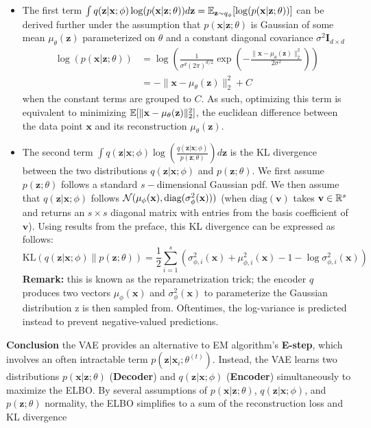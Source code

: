 \begin{itemize}
    \item The first term $\int q(\mathbf{z}|\mathbf{x};\phi) \log(p(\mathbf{x}|\mathbf{z};\theta)) d\mathbf{z}=\mathbb{E}_{\mathbf{z}\sim q_{\phi}}[\log(p(\mathbf{x}|\mathbf{z};\theta))]$ can be derived further under the assumption that $p(\mathbf{x}|\mathbf{z};\theta)$ is Gaussian of some mean $\mu_{\theta}(\mathbf{z})$ parameterized on $\theta$ and a constant diagonal covariance $\sigma^2 \mathbf{I}_{d\times d}$
    \begin{align*}
        \log(p(\mathbf{x}|\mathbf{z};\theta))
        &= \log\left( \frac{1}{\sigma^d (2\pi)^{d/2}} \exp\left( -\frac{\|\mathbf{x} - \mu_\theta(\mathbf{z})\|_2^2}{2\sigma^2} \right) \right) \\
        &= -\|\mathbf{x} - \mu_\theta(\mathbf{z})\|_2^2 + C
    \end{align*}
    when the constant terms are grouped to $C$. As such, optimizing this term is equivalent to minimizing $\mathbb{E}[\|\mathbf{x} - \mu_\theta(\mathbf{z})\|_2^2]$, the euclidean difference between the data point $\mathbf{x}$ and its reconstruction $\mu_\theta(\mathbf{z})$.
    \item The second term $\int q(\mathbf{z}|\mathbf{x};\phi) \log\left(\frac{q(\mathbf{z}|\mathbf{x};\phi)}{p(\mathbf{z};\theta)}\right) d\mathbf{z}$ is the KL divergence between the two distributions $q(\mathbf{z}|\mathbf{x};\phi)$ and $p(\mathbf{z};\theta)$. We first assume $p(\mathbf{z};\theta)$ follows a standard $s-$dimensional Gaussian pdf. We then assume that $q(\mathbf{z}|\mathbf{x};\phi)$ follows $\mathcal{N}(\mu_{\phi}(\mathbf{x}),\text{diag}(\sigma_{\phi}^2(\mathbf{x})))$ (when $\text{diag}(\mathbf{v})$ takes $\mathbf{v}\in\mathbb{R}^s$ and returns an $s\times s$ diagonal matrix with entries from the basis coefficient of $\mathbf{v}$). Using results from the preface, this KL divergence can be expressed as follows:
    \[
        \mathrm{KL}(q(\mathbf{z}|\mathbf{x};\phi) \| p(\mathbf{z};\theta)) = \frac{1}{2} \sum_{i=1}^s \left( \sigma_{\phi,i}^2(\mathbf{x}) + \mu_{\phi,i}^2(\mathbf{x}) - 1 - \log \sigma_{\phi,i}^2(\mathbf{x}) \right)
    \]
    \textbf{Remark:} this is known as the reparametrization trick; the encoder $q$ produces two vectors $\mu_{\phi}(\mathbf{x})$ and $\sigma_{\phi}^2(\mathbf{x})$ to parameterize the Gaussian distribution $\text{z}$ is then sampled from. Oftentimes, the log-variance is predicted instead to prevent negative-valued predictions.
\end{itemize}
\textbf{Conclusion} the VAE provides an alternative to EM algorithm's \textbf{E-step}, which involves an often intractable term $p(\mathbf{z}|\mathbf{x}_i;\theta^{(t)})$. Instead, the VAE learns two distributions $p(\mathbf{x}|\mathbf{z};\theta)$ (\textbf{Decoder}) and $q(\mathbf{z}|\mathbf{x};\phi)$ (\textbf{Encoder}) simultaneously to maximize the ELBO. By several assumptions of $p(\mathbf{x}|\mathbf{z};\theta)$, $q(\mathbf{z}|\mathbf{x};\phi)$, and $p(\mathbf{z};\theta)$ normality, the ELBO simplifies to a sum of the reconstruction loss and KL divergence

